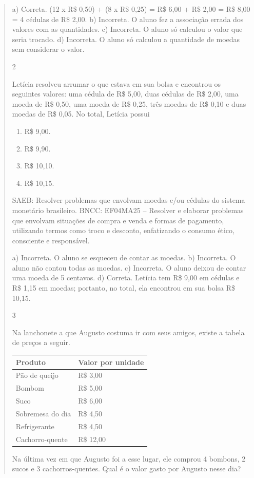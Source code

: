 \begin{mdframed}[linewidth=2pt,linecolor=salmao,roundcorner=2pt]
\begin{itemize}
{\begin{itemize}
\begin{escolha}
{\begin{quote}
{\begin{escolha}
a) Correta. (12 x R\$ 0,50) + (8 x R\$ 0,25) = R\$ 6,00 + R\$ 2,00 = R\$ 8,00 = 4 cédulas de R\$ 2,00.
b) Incorreta. O aluno fez a associação errada dos valores com as quantidades.
c) Incorreta. O aluno só calculou o valor que seria trocado.
d) Incorreta. O aluno só calculou a quantidade de moedas sem considerar o valor.


\num{2}

Letícia resolveu arrumar o que estava em sua bolsa e encontrou
os seguintes valores: uma cédula de R\$ 5,00, duas cédulas de R\$ 2,00, uma moeda de R\$ 0,50, uma moeda de R\$ 0,25, três moedas de R\$ 0,10 e duas moedas de R\$ 0,05. No total, Letícia possui

\begin{enumerate}
\item
  R\$ 9,00.
\item
  R\$ 9,90.
\item
  R\$ 10,10.
\item
  R\$ 10,15.
\end{enumerate}

SAEB: Resolver problemas que envolvam moedas e/ou cédulas do sistema monetário brasileiro.
BNCC: EF04MA25 -- Resolver e elaborar problemas que envolvam situações de compra e venda e formas
de pagamento, utilizando termos como troco e desconto, enfatizando o consumo ético, consciente e
responsável.

a) Incorreta. O aluno se esqueceu de contar as moedas.
b) Incorreta. O aluno não contou todas as moedas.
c) Incorreta. O aluno deixou de contar uma moeda de 5 centavos.
d) Correta. Letícia tem R\$ 9,00 em cédulas e R\$ 1,15 em moedas; portanto, no total, ela
encontrou em sua bolsa R\$ 10,15.

\num{3}

Na lanchonete a que Augusto costuma ir com seus amigos, existe a tabela de preços a seguir.

\begin{longtable}[]{@{}ll@{}}
\toprule
Produto & Valor por unidade\tabularnewline
\midrule
\endhead
Pão de queijo & R\$ 3,00\tabularnewline
Bombom & R\$ 5,00\tabularnewline
Suco & R\$ 6,00\tabularnewline
Sobremesa do dia & R\$ 4,50\tabularnewline
Refrigerante & R\$ 4,50\tabularnewline
Cachorro-quente & R\$ 12,00\tabularnewline
\bottomrule
\end{longtable}

Na última vez em que Augusto foi a esse lugar, ele comprou 4 bombons, 2
sucos e 3 cachorros-quentes. Qual é o valor gasto por Augusto nesse dia?


\end{escolha}}
\end{quote}}
\end{escolha}
\end{itemize}}
\end{itemize}
\end{mdframed}
